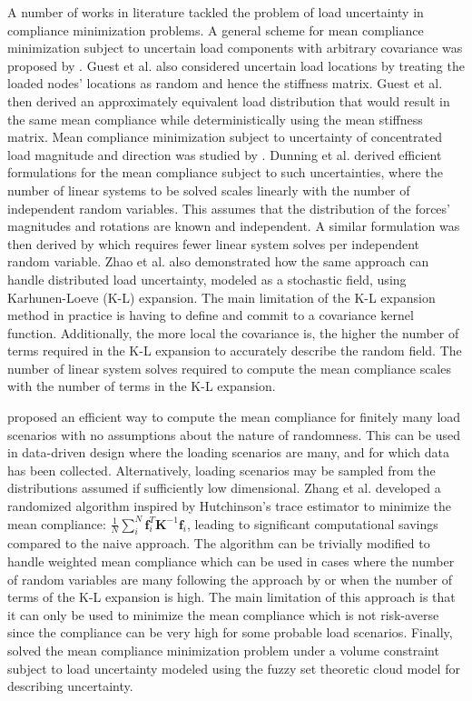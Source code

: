     A number of works in literature tackled the problem of load uncertainty in compliance minimization problems. A general scheme for mean compliance minimization subject to uncertain load components with arbitrary covariance was proposed by \cite{Guest2008}. Guest et al. also considered uncertain load locations by treating the loaded nodes' locations as random and hence the stiffness matrix. Guest et al. then derived an approximately equivalent load distribution that would result in the same mean compliance while deterministically using the mean stiffness matrix. Mean compliance minimization subject to uncertainty of concentrated load magnitude and direction was studied by \cite{Dunning2011}. Dunning et al. derived efficient formulations for the mean compliance subject to such uncertainties, where the number of linear systems to be solved scales linearly with the number of independent random variables. This assumes that the distribution of the forces' magnitudes and rotations are known and independent. A similar formulation was then derived by \cite{Zhao2014} which requires fewer linear system solves per independent random variable. Zhao et al. also demonstrated how the same approach can handle distributed load uncertainty, modeled as a stochastic field, using Karhunen-Loeve (K-L) expansion. The main limitation of the K-L expansion method in practice is having to define and commit to a covariance kernel function. Additionally, the more local the covariance is, the higher the number of terms required in the K-L expansion to accurately describe the random field. The number of linear system solves required to compute the mean compliance scales with the number of terms in the K-L expansion.

    \cite{Zhang2017a} proposed an efficient way to compute the mean compliance for finitely many load scenarios with no assumptions about the nature of randomness. This can be used in data-driven design where the loading scenarios are many, and for which data has been collected. Alternatively, loading scenarios may be sampled from the distributions assumed if sufficiently low dimensional. Zhang et al. developed a randomized algorithm inspired by Hutchinson's trace estimator \cite{Hutchinson1990} to minimize the mean compliance: $\frac{1}{N} \sum_i^N \bm{f}^T_i \bm{K}^{-1} \bm{f}_i$, leading to significant computational savings compared to the naive approach. The algorithm can be trivially modified to handle weighted mean compliance which can be used in cases where the number of random variables are many following the approach by \cite{Zhao2014} or when the number of terms of the K-L expansion is high. The main limitation of this approach is that it can only be used to minimize the mean compliance which is not risk-averse since the compliance can be very high for some probable load scenarios. Finally, \cite{Liu2018a} solved the mean compliance minimization problem under a volume constraint subject to load uncertainty modeled using the fuzzy set theoretic cloud model for describing uncertainty.

